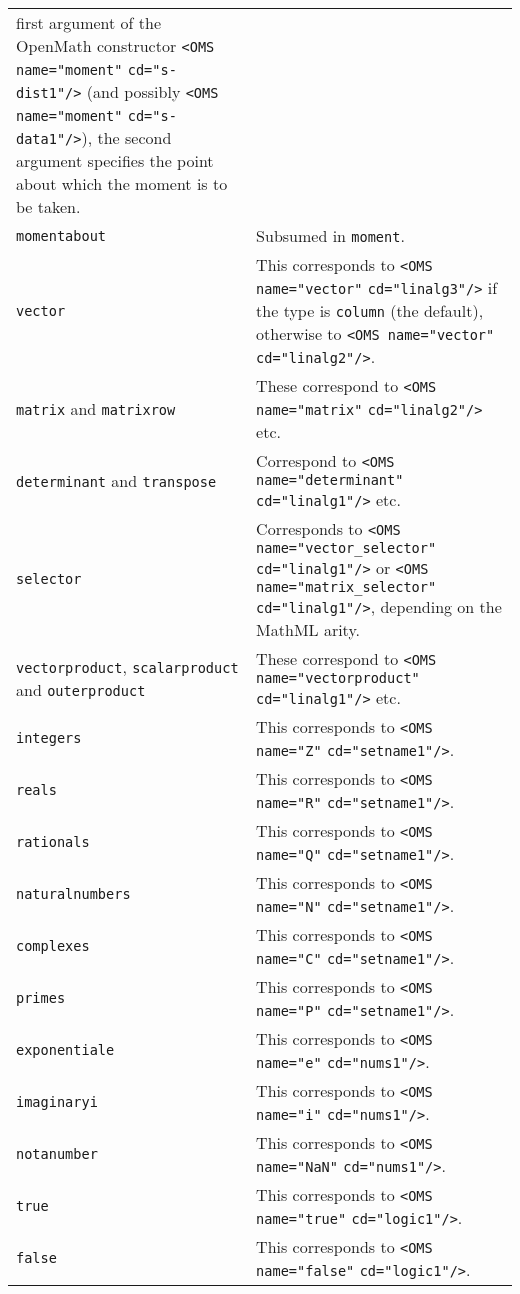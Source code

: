\documentclass[twoside,11pt]{article}
\begin{document}
\begin{longtable}{
        >{\raggedright\let\\=\tabularnewline}p{2in}
        >{\raggedright\let\\=\tabularnewline}p{3in}}
first argument of the OpenMath constructor
\verb+<OMS name="moment"+ \verb+cd="s-dist1"/>+ (and possibly 
\verb+<OMS name="moment"+ \verb+cd="s-data1"/>+), the second argument
specifies the point about which the moment is to be taken.\\
\verb+momentabout+&Subsumed in \verb+moment+.\\
\verb+vector+&This corresponds to
\verb+<OMS name="vector"+ \verb+cd="linalg3"/>+ if the type is
\verb+column+ (the default), otherwise to \verb+<OMS name="vector"+ 
\verb+cd="linalg2"/>+.\\
\verb+matrix+ and \verb+matrixrow+&These correspond to 
\verb+<OMS name="matrix"+ \verb+cd="linalg2"/>+ etc.\\
\verb+determinant+ and \verb+transpose+&Correspond to 
\verb+<OMS name="determinant"+ \verb+cd="linalg1"/>+ etc.\\
\verb+selector+&Corresponds to 
\verb+<OMS name="vector_selector"+ \verb+cd="linalg1"/>+ or
\verb+<OMS name="matrix_selector"+ \verb+cd="linalg1"/>+, depending on the
MathML arity.\\
\verb+vectorproduct+, \verb+scalarproduct+ and
\verb+outerproduct+&These correspond to
\verb+<OMS name="vectorproduct"+ \verb+cd="linalg1"/>+ etc.\\
\verb+integers+&This corresponds to
\verb+<OMS name="Z"+ \verb+cd="setname1"/>+.\\
\verb+reals+&This corresponds to
\verb+<OMS name="R"+ \verb+cd="setname1"/>+.\\
\verb+rationals+&This corresponds to
\verb+<OMS name="Q"+ \verb+cd="setname1"/>+.\\
\verb+naturalnumbers+&This corresponds to
\verb+<OMS name="N"+ \verb+cd="setname1"/>+.\\
\verb+complexes+&This corresponds to
\verb+<OMS name="C"+ \verb+cd="setname1"/>+.\\
\verb+primes+&This corresponds to
\verb+<OMS name="P"+ \verb+cd="setname1"/>+.\\
\verb+exponentiale+&This corresponds to
\verb+<OMS name="e"+ \verb+cd="nums1"/>+.\\
\verb+imaginaryi+&This corresponds to
\verb+<OMS name="i"+ \verb+cd="nums1"/>+.\\
\verb+notanumber+&This corresponds to
\verb+<OMS name="NaN"+ \verb+cd="nums1"/>+.\\
\verb+true+&This corresponds to
\verb+<OMS name="true"+ \verb+cd="logic1"/>+.\\
\verb+false+&This corresponds to
\verb+<OMS name="false"+ \verb+cd="logic1"/>+.\\

\end{longtable}
\end{document}

